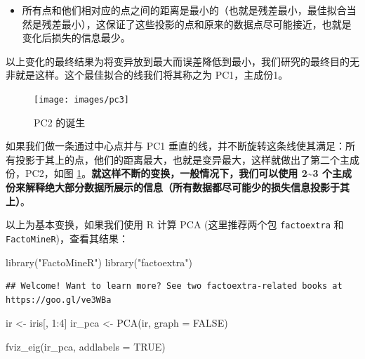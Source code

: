 \documentclass[
]{krantz}
\makeatletter
\newenvironment{Shaded}{\begin{snugshade}}{\end{snugshade}}
\newcommand{\AttributeTok}[1]{\textcolor[rgb]{0.77,0.63,0.00}{#1}}
\newcommand{\ConstantTok}[1]{\textcolor[rgb]{0.00,0.00,0.00}{#1}}
\newcommand{\DecValTok}[1]{\textcolor[rgb]{0.00,0.00,0.81}{#1}}
\newcommand{\FunctionTok}[1]{\textcolor[rgb]{0.00,0.00,0.00}{#1}}
\newcommand{\NormalTok}[1]{#1}
\newcommand{\OtherTok}[1]{\textcolor[rgb]{0.56,0.35,0.01}{#1}}
\newcommand{\SpecialCharTok}[1]{\textcolor[rgb]{0.00,0.00,0.00}{#1}}
\newcommand{\StringTok}[1]{\textcolor[rgb]{0.31,0.60,0.02}{#1}}
\providecommand{\tightlist}{%
  \setlength{\itemsep}{0pt}\setlength{\parskip}{0pt}}
\newenvironment{kframe}{%
\medskip{}
\setlength{\fboxsep}{.8em}
 \def\at@end@of@kframe{}%
 \ifinner\ifhmode%
  \def\at@end@of@kframe{\end{minipage}}%
  \begin{minipage}{\columnwidth}%
 \fi\fi%
 \def\FrameCommand##1{\hskip\@totalleftmargin \hskip-\fboxsep
 \colorbox{shadecolor}{##1}\hskip-\fboxsep
     \hskip-\linewidth \hskip-\@totalleftmargin \hskip\columnwidth}%
 \MakeFramed {\advance\hsize-\width
   \@totalleftmargin\z@ \linewidth\hsize
   \@setminipage}}%
 {\par\unskip\endMakeFramed%
 \at@end@of@kframe}
\renewenvironment{Shaded}{\begin{kframe}}{\end{kframe}}
\makeatother
\begin{document}
\begin{itemize}
\tightlist
\item
  所有点和他们相对应的点之间的距离是最小的（也就是残差最小，最佳拟合当然是残差最小），这保证了这些投影的点和原来的数据点尽可能接近，也就是变化后损失的信息最少。
\end{itemize}

以上变化的最终结果为将变异放到最大而误差降低到最小，我们研究的最终目的无非就是这样。这个最佳拟合的线我们将其称之为 PC1，主成份1。

\begin{figure}
\texttt{[image: images/pc3]} \caption{PC2 的诞生}\label{fig:pc3}
\end{figure}

如果我们做一条通过中心点并与 PC1 垂直的线，并不断旋转这条线使其满足：所有投影于其上的点，他们的距离最大，也就是变异最大，这样就做出了第二个主成份，PC2，如图 \ref{fig:pc3}。\textbf{就这样不断的变换，一般情况下，我们可以使用 2\textasciitilde3 个主成份来解释绝大部分数据所展示的信息（所有数据都尽可能少的损失信息投影于其上）}。

以上为基本变换，如果我们使用 R 计算 PCA (这里推荐两个包 \texttt{factoextra} 和 \texttt{FactoMineR})，查看其结果：

\begin{Shaded}
\begin{Highlighting}[]
\FunctionTok{library}\NormalTok{(}\StringTok{"FactoMineR"}\NormalTok{)}
\FunctionTok{library}\NormalTok{(}\StringTok{"factoextra"}\NormalTok{)}
\end{Highlighting}
\end{Shaded}

\begin{verbatim}
## Welcome! Want to learn more? See two factoextra-related books at https://goo.gl/ve3WBa
\end{verbatim}

\begin{Shaded}
\begin{Highlighting}[]
\NormalTok{ir }\OtherTok{\textless{}{-}}\NormalTok{ iris[, }\DecValTok{1}\SpecialCharTok{:}\DecValTok{4}\NormalTok{]}
\NormalTok{ir\_pca }\OtherTok{\textless{}{-}} \FunctionTok{PCA}\NormalTok{(ir, }\AttributeTok{graph =} \ConstantTok{FALSE}\NormalTok{)}

\FunctionTok{fviz\_eig}\NormalTok{(ir\_pca, }\AttributeTok{addlabels =} \ConstantTok{TRUE}\NormalTok{)}
\end{Highlighting}
\end{Shaded}
\end{document}
